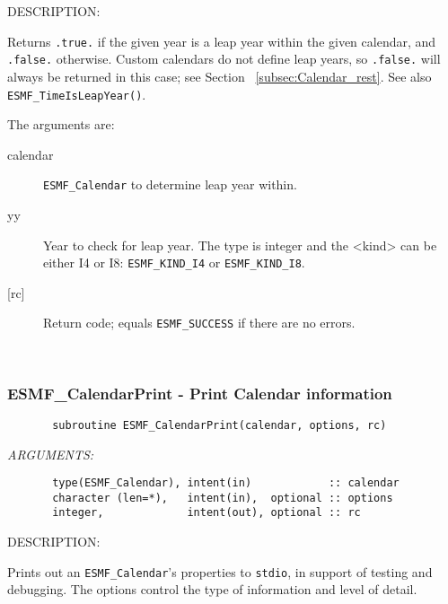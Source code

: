 {\sf DESCRIPTION:\\ }


       \begin{sloppypar}
       Returns {\tt .true.} if the given year is a leap year within the given
       calendar, and {\tt .false.} otherwise.  Custom calendars do not define
       leap years, so {\tt .false.} will always be returned in this case;
       see Section ~\ref{subsec:Calendar_rest}.
       See also {\tt ESMF\_TimeIsLeapYear()}.
       \end{sloppypar}
  
       The arguments are:
       \begin{description}
       \item[calendar]
            {\tt ESMF\_Calendar} to determine leap year within.
       \item[yy]
            Year to check for leap year.  The type is integer and the <kind> can
            be either I4 or I8:  {\tt ESMF\_KIND\_I4} or {\tt ESMF\_KIND\_I8}.
       \item[{[rc]}]
            Return code; equals {\tt ESMF\_SUCCESS} if there are no errors.
       \end{description}
       
 
\mbox{}\hrulefill\ 
 
\subsubsection [ESMF\_CalendarPrint] {ESMF\_CalendarPrint - Print Calendar information}


 
\begin{verbatim}       subroutine ESMF_CalendarPrint(calendar, options, rc)
 \end{verbatim}{\em ARGUMENTS:}
\begin{verbatim}       type(ESMF_Calendar), intent(in)            :: calendar
       character (len=*),   intent(in),  optional :: options
       integer,             intent(out), optional :: rc
 \end{verbatim}
{\sf DESCRIPTION:\\ }


       Prints out an {\tt ESMF\_Calendar}'s properties to {\tt stdio}, 
       in support of testing and debugging.  The options control the 
       type of information and level of detail. \\
  
